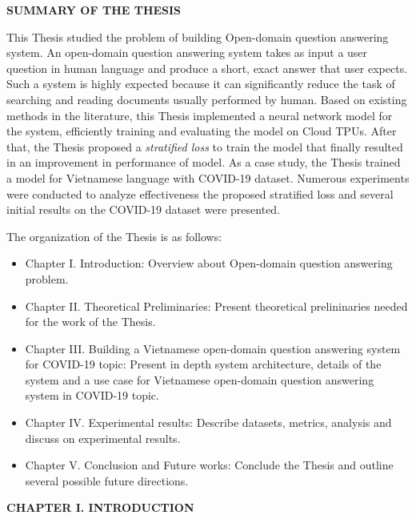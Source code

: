\documentclass[3p, sort&compress, 12pt]{elsarticle}
\begin{document}
\newpage
\begin{center}
	\fontsize{20}{\baselineskip}\selectfont\sf\bfseries SUMMARY OF THE THESIS
\end{center}
This Thesis studied the problem of building Open-domain question answering system. An open-domain question answering system takes as input a user question in human language and produce a short, exact answer that user expects. Such a system is highly expected because it can significantly reduce the task of searching and reading documents usually performed by human. Based on existing methods in the literature, this Thesis implemented a neural network model for the system, efficiently training and evaluating the model on Cloud TPUs. After that, the Thesis proposed a \textit{stratified loss} to train the model that finally resulted in an improvement in performance of model. As a case study, the Thesis trained a model for Vietnamese language with COVID-19 dataset. Numerous experiments were conducted to analyze effectiveness the proposed stratified loss and several initial results on the COVID-19 dataset were presented.
\par The organization of the Thesis is as follows:
\begin{itemize}
	\item Chapter I. Introduction: Overview about Open-domain question answering problem.
	\item Chapter II. Theoretical Preliminaries: Present theoretical prelininaries needed for the work of the Thesis.
	\item Chapter III. Building a Vietnamese open-domain question answering system for COVID-19 topic: Present in depth system architecture, details of the system and a use case for Vietnamese open-domain question answering system in COVID-19 topic.
	\item Chapter IV. Experimental results: Describe datasets, metrics, analysis and discuss on experimental results.
	\item Chapter V. Conclusion and Future works: Conclude the Thesis and outline several possible future directions.
\end{itemize}
\newpage
\begin{center}
	\fontsize{20}{\baselineskip}\selectfont\sf\bfseries CHAPTER I. INTRODUCTION
\end{center}
\label{chap:01}
\end{document}
